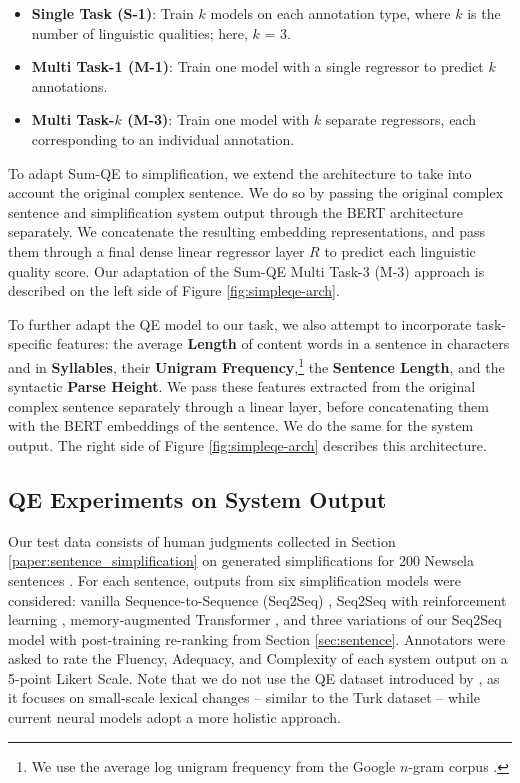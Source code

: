 \documentclass[thesis.tex]{subfiles}
\begin{document}
\begin{itemize}
    \item \textbf{Single Task (S-1)}: Train $k$ models on each annotation type, where $k$ is the number of linguistic qualities; here, $k$ = 3.
    \item \textbf{Multi Task-1 (M-1)}: Train one model with a single regressor to predict $k$ annotations.
    \item \textbf{Multi Task-$k$ (M-3)}: Train one model with $k$ separate regressors, each corresponding to an individual annotation.
\end{itemize}

To adapt Sum-QE to simplification, we extend the architecture to take into account the original complex sentence. We do so by passing the original complex sentence and simplification system output through the BERT architecture separately. We concatenate the resulting embedding representations, and pass them through a final dense linear regressor layer $R$ to predict each linguistic quality score. Our adaptation of the Sum-QE Multi Task-3 (M-3) approach is described on the left side of Figure \ref{fig:simpleqe-arch}.

To further adapt the QE model to our task, we also attempt to incorporate task-specific features: the average {\bf Length} of content words in a sentence in characters and in {\bf Syllables}, their {\bf Unigram Frequency},\footnote{We use the average log unigram frequency from the Google $n$-gram corpus \citep{thorsten2006web}.} the {\bf Sentence Length}, and the syntactic {\bf Parse Height}. We pass these features extracted from the original complex sentence separately through a linear layer, before concatenating them with the BERT embeddings of the sentence. We do the same for the system output. The right side of Figure \ref{fig:simpleqe-arch} describes this architecture.

\subsection{QE Experiments on System Output} \label{sec:simpleqe-experiments}

Our test data consists of human judgments collected in Section \ref{paper:sentence_simplification} on generated simplifications for 200 Newsela sentences \citep{xu2015problems}. For each sentence, outputs from six simplification models were considered: vanilla Sequence-to-Sequence (Seq2Seq) \citep{nisioi2017exploring}, Seq2Seq with reinforcement learning \citep{zhang2017sentence}, memory-augmented Transformer \citep{zhao2018integrating}, and three variations of our Seq2Seq model with post-training re-ranking from Section \ref{sec:sentence}. Annotators were asked to rate the Fluency, Adequacy, and Complexity of each system output on a 5-point Likert Scale. Note that we do not use the QE dataset introduced by \cite{stajner2016quality}, as it focuses on small-scale lexical changes -- similar to the Turk dataset \citep{xu2016optimizing} -- while current neural models adopt a more holistic approach.
\end{document}
